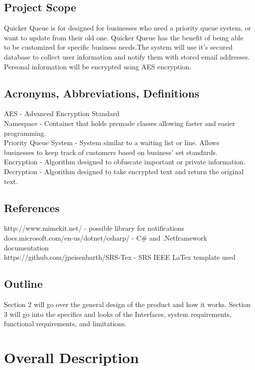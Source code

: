 \documentclass{scrreprt}
\begin{document}
\section{Project Scope}
Quicker Queue is for designed for businesses who need a priority queue system, or want to update from their old one.
Quicker Queue has the benefit of being able to be customized for specific business needs.The system will use it's secured database 
to collect user information and notify them with stored email addresses. Personal information will be encrypted using AES encryption.

\section{Acronyms, Abbreviations, Definitions}
AES - Advanced Encryption Standard\\
Namespace - Container that holds premade classes allowing faster and easier programming.\\
Priority Queue System - System similar to a waiting list or line. Allows businesses to keep track of customers based on business' set standards.\\
Encryption - Algorithm designed to obfuscate important or private information.\\
Decryption - Algorithm designed to take encrypted text and return the original text.


\section{References}
http://www.mimekit.net/ - possible library for notifications\\
docs.microsoft.com/en-us/dotnet/csharp/ - C\# and .Netframework documentation\\
https://github.com/jpeisenbarth/SRS-Tex - SRS IEEE LaTex template used

\section{Outline}
Section 2 will go over the general design of the product and how it works. Section 3 will go into the specifics and looks of the Interfaces, system requirements, functional requirements, and limitations.


\chapter{Overall Description}
\end{document}
